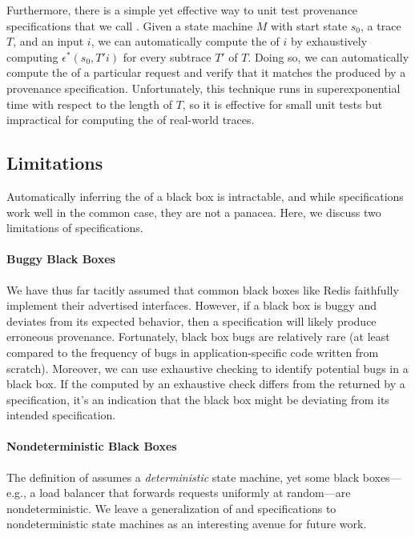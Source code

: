 Furthermore, there is a simple yet effective way to unit test provenance
specifications that we call .
Given a state machine $M$ with start state $s_0$, a trace $T$, and an input
$i$, we can automatically compute the \watprovenance{} of $i$ by exhaustively
computing $\epsilon^*(s_0, T'i)$ for every subtrace $T'$ of $T$.  Doing so, we
can automatically compute the \watprovenance{} of a particular request and
verify that it matches the \watprovenance{} produced by a provenance
specification.  Unfortunately, this technique runs in superexponential time
with respect to the length of $T$, so it is effective for small unit tests but
impractical for computing the \watprovenance{} of real-world traces.

\subsection{Limitations}
Automatically inferring the \watprovenance{} of a black box is intractable, and
while \watprovenance{} specifications work well in the common case, they are
not a panacea. Here, we discuss two limitations of \watprovenance{}
specifications.

\paragraph{Buggy Black Boxes}
We have thus far tacitly assumed that common black boxes like Redis faithfully
implement their advertised interfaces. However, if a black box is buggy and
deviates from its expected behavior, then a \watprovenance{} specification will
likely produce erroneous provenance. Fortunately, black box bugs are relatively
rare (at least compared to the frequency of bugs in application-specific code
written from scratch). Moreover, we can use exhaustive \watprovenance{}
checking to identify potential bugs in a black box. If the \watprovenance{}
computed by an exhaustive \watprovenance{} check differs from the
\watprovenance{} returned by a specification, it's an indication that the black
box might be deviating from its intended specification.

\paragraph{Nondeterministic Black Boxes}
The definition of \watprovenance{} assumes a \emph{deterministic} state
machine, yet some black boxes---e.g., a load balancer that forwards requests
uniformly at random---are nondeterministic. We leave a generalization of
\watprovenance{} and \watprovenance{} specifications to nondeterministic state
machines as an interesting avenue for future work.
